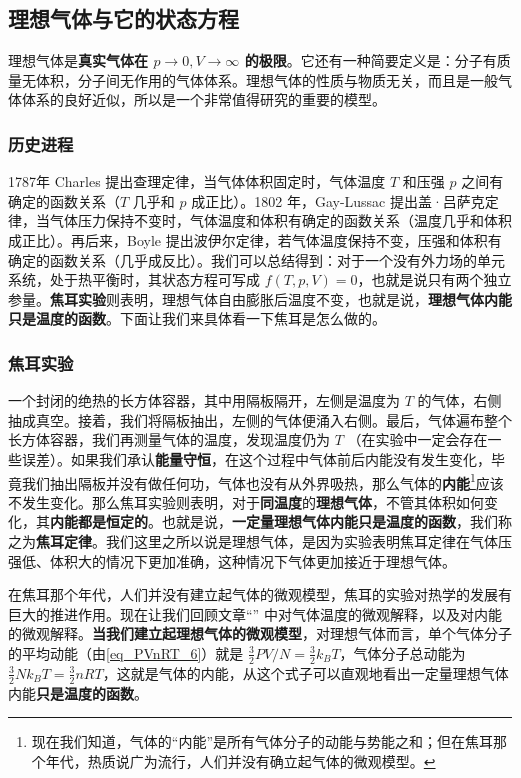 

\subsection{理想气体与它的状态方程}

理想气体是\textbf{真实气体在 $p\rightarrow 0,V\rightarrow \infty$ 的极限}。它还有一种简要定义是：分子有质量无体积，分子间无作用的气体体系。理想气体的性质与物质无关，而且是一般气体体系的良好近似，所以是一个非常值得研究的重要的模型。
\subsubsection{历史进程}
1787年 Charles 提出查理定律，当气体体积固定时，气体温度 $T$ 和压强 $p$ 之间有确定的函数关系（$T$ 几乎和 $p$ 成正比）。1802 年，Gay-Lussac 提出盖·吕萨克定律，当气体压力保持不变时，气体温度和体积有确定的函数关系（温度几乎和体积成正比）。再后来，Boyle 提出波伊尔定律，若气体温度保持不变，压强和体积有确定的函数关系（几乎成反比）。我们可以总结得到：对于一个没有外力场的单元系统，处于热平衡时，其状态方程可写成 $f(T,p,V)=0$，也就是说只有两个独立参量。\textbf{焦耳实验}则表明，理想气体自由膨胀后温度不变，也就是说，\textbf{理想气体内能只是温度的函数}。下面让我们来具体看一下焦耳是怎么做的。
\subsubsection{焦耳实验}
一个封闭的绝热的长方体容器，其中用隔板隔开，左侧是温度为 $T$ 的气体，右侧抽成真空。接着，我们将隔板抽出，左侧的气体便涌入右侧。最后，气体遍布整个长方体容器，我们再测量气体的温度，发现温度仍为 $T$ （在实验中一定会存在一些误差）。如果我们承认\textbf{能量守恒}，在这个过程中气体前后内能没有发生变化，毕竟我们抽出隔板并没有做任何功，气体也没有从外界吸热，那么气体的\textbf{内能}\footnote{现在我们知道，气体的“内能”是所有气体分子的动能与势能之和；但在焦耳那个年代，热质说广为流行，人们并没有确立起气体的微观模型。}应该不发生变化。那么焦耳实验则表明，对于\textbf{同温度}的\textbf{理想气体}，不管其体积如何变化，其\textbf{内能都是恒定的}。也就是说，\textbf{一定量理想气体内能只是温度的函数}，我们称之为\textbf{焦耳定律}。我们这里之所以说是理想气体，是因为实验表明焦耳定律在气体压强低、体积大的情况下更加准确，这种情况下气体更加接近于理想气体。

在焦耳那个年代，人们并没有建立起气体的微观模型，焦耳的实验对热学的发展有巨大的推进作用。现在让我们回顾文章“” 中对气体温度的微观解释，以及对内能的微观解释。\textbf{当我们建立起理想气体的微观模型}，对理想气体而言，单个气体分子的平均动能（由\autoref{eq_PVnRT_6}）就是 $\frac{3}{2}PV/N = \frac{3}{2}k_B T$，气体分子总动能为 $\frac{3}{2}N k_B T=\frac{3}{2}nRT$，这就是气体的内能，从这个式子可以直观地看出一定量理想气体内能\textbf{只是温度的函数}。

